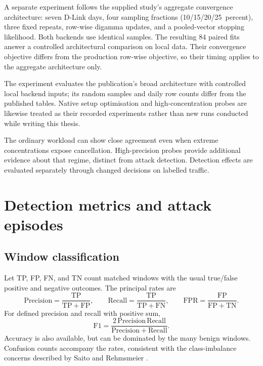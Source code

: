 A separate experiment follows the supplied study's aggregate convergence
architecture: seven D-Link days, four sampling fractions
(10/15/20/25~percent), three fixed repeats, row-wise digamma updates,
and a pooled-vector stopping likelihood. Both backends use identical
samples. The resulting 84 paired fits answer a controlled architectural
comparison on local data. Their convergence objective differs from the
production row-wise objective, so their timing applies to the aggregate
architecture only.

The experiment evaluates the publication's broad architecture with
controlled local backend inputs; its random samples and daily row counts
differ from the published tables. Native setup optimisation
and high-concentration probes are likewise treated as their recorded
experiments rather than new runs conducted while writing this thesis.

The ordinary workload can show close agreement even when extreme
concentrations expose cancellation. High-precision probes provide
additional evidence about that regime, distinct from attack detection.
Detection effects are evaluated separately through changed decisions on
labelled traffic.

\section{Detection metrics and attack episodes}
\label{sec:experimental-metrics}

\subsection{Window classification}

Let TP, FP, FN, and TN count matched windows with the usual true/false
positive and negative outcomes. The principal rates are
\begin{equation}
 \mathrm{Precision}=\frac{\mathrm{TP}}{\mathrm{TP}+\mathrm{FP}},\qquad
 \mathrm{Recall}=\frac{\mathrm{TP}}{\mathrm{TP}+\mathrm{FN}},\qquad
 \mathrm{FPR}=\frac{\mathrm{FP}}{\mathrm{FP}+\mathrm{TN}}.
\label{eq:classification-rates}
\end{equation}
For defined precision and recall with positive sum,
\[
 \mathrm{F1}=\frac{2\,\mathrm{Precision}\,\mathrm{Recall}}
                  {\mathrm{Precision}+\mathrm{Recall}}.
\]
Accuracy is also available, but can be dominated by the many benign
windows. Confusion counts accompany the rates, consistent with the
class-imbalance concerns described by Saito and Rehmsmeier
\cite{saito2015}.

